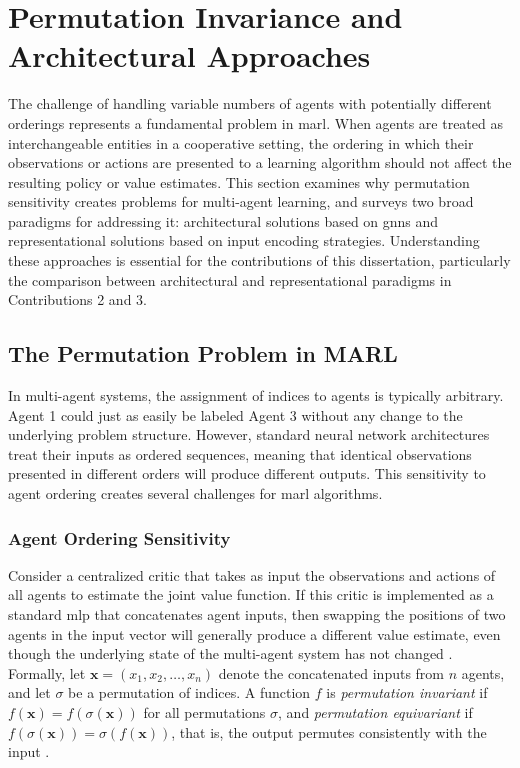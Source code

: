 \section{Permutation Invariance and Architectural Approaches}
\label{sec:permutation-invariance}

The challenge of handling variable numbers of agents with potentially
different orderings represents a fundamental problem in \gls{marl}.
When agents are treated as interchangeable entities in a cooperative
setting, the ordering in which their observations or actions are
presented to a learning algorithm should not affect the resulting
policy or value estimates. This section examines why permutation
sensitivity creates problems for multi-agent learning, and surveys
two broad paradigms for addressing it: architectural solutions based
on \glspl{gnn} and representational solutions based on input encoding
strategies. Understanding these approaches is essential for the
contributions of this dissertation, particularly the comparison
between architectural and representational paradigms in
Contributions 2 and 3.

\subsection{The Permutation Problem in MARL}
\label{sec:permutation-problem}

In multi-agent systems, the assignment of indices to agents is
typically arbitrary. Agent 1 could just as easily be labeled Agent 3
without any change to the underlying problem structure. However,
standard neural network architectures treat their inputs as ordered
sequences, meaning that identical observations presented in different
orders will produce different outputs. This sensitivity to agent
ordering creates several challenges for \gls{marl} algorithms.

\subsubsection{Agent Ordering Sensitivity}

Consider a centralized critic that takes as input the observations
and actions of all agents to estimate the joint value function.
If this critic is implemented as a standard \gls{mlp} that
concatenates agent inputs, then swapping the positions of two
agents in the input vector will generally produce a different
value estimate, even though the underlying state of the multi-agent
system has not changed \cite{liu2020b}. Formally, let
$\mathbf{x} = (x_1, x_2, \ldots, x_n)$ denote the concatenated
inputs from $n$ agents, and let $\sigma$ be a permutation of
indices. A function $f$ is \emph{permutation invariant} if
$f(\mathbf{x}) = f(\sigma(\mathbf{x}))$ for all permutations $\sigma$,
and \emph{permutation equivariant} if
$f(\sigma(\mathbf{x})) = \sigma(f(\mathbf{x}))$, that is, the output
permutes consistently with the input \cite{zaheer2017}.

